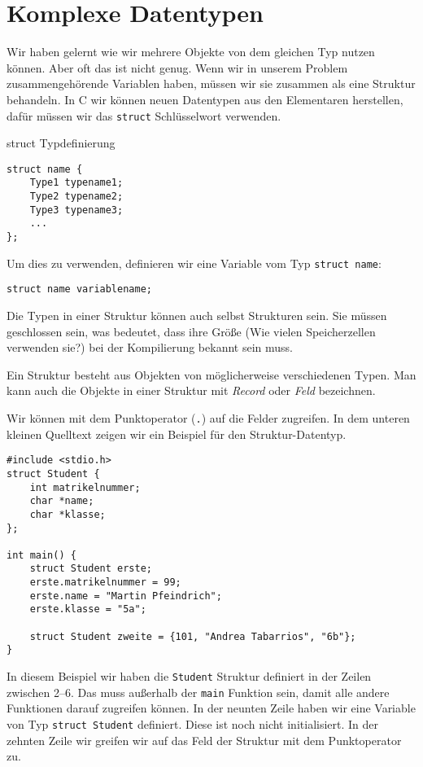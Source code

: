 \section{Komplexe Datentypen}

Wir haben gelernt wie wir mehrere Objekte von dem gleichen Typ nutzen
können. Aber oft das ist nicht genug. Wenn wir in unserem Problem
zusammengehörende Variablen haben, müssen wir sie zusammen 
als eine Struktur behandeln. In C wir können neuen Datentypen aus
den Elementaren herstellen, dafür müssen wir das \texttt{struct} Schlüsselwort
verwenden.

\begin{myalertblock}{struct Typdefinierung}
\begin{lstlisting}
struct name {
    Type1 typename1;
    Type2 typename2;
    Type3 typename3;
    ...
};
\end{lstlisting}

Um dies zu verwenden, definieren wir eine Variable vom Typ \texttt{struct name}:

\begin{lstlisting}
struct name variablename;
\end{lstlisting}

Die Typen in einer Struktur können auch selbst Strukturen sein.
Sie müssen geschlossen sein, was bedeutet, dass ihre Größe
(Wie vielen Speicherzellen verwenden sie?) bei der Kompilierung
bekannt sein muss.
\end{myalertblock}

Ein Struktur besteht aus Objekten von möglicherweise verschiedenen Typen. Man
kann auch die Objekte in einer Struktur mit \emph{Record} oder \emph{Feld}
bezeichnen.

Wir können mit dem Punktoperator (\texttt{.}) auf die Felder zugreifen. In dem
unteren kleinen Quelltext zeigen wir ein Beispiel für den Struktur-Datentyp.

\begin{lstlisting}
#include <stdio.h>
struct Student {
    int matrikelnummer;
    char *name;
    char *klasse;
};

int main() {
    struct Student erste;
    erste.matrikelnummer = 99;
    erste.name = "Martin Pfeindrich";
    erste.klasse = "5a";

    struct Student zweite = {101, "Andrea Tabarrios", "6b"};
}
\end{lstlisting}

In diesem Beispiel wir haben die \texttt{Student} Struktur definiert in der Zeilen zwischen 2--6.
Das muss außerhalb der \texttt{main} Funktion sein, damit alle andere Funktionen darauf zugreifen können.
In der neunten Zeile haben wir eine Variable von Typ \texttt{struct Student} definiert. Diese ist noch
nicht initialisiert. In der zehnten Zeile wir greifen wir auf das Feld der Struktur mit dem Punktoperator zu. 

